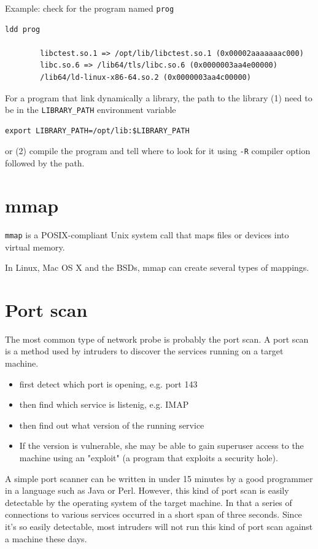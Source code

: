 Example: check for the program named \verb!prog!
\begin{verbatim}
ldd prog

        libctest.so.1 => /opt/lib/libctest.so.1 (0x00002aaaaaaac000)
        libc.so.6 => /lib64/tls/libc.so.6 (0x0000003aa4e00000)
        /lib64/ld-linux-x86-64.so.2 (0x0000003aa4c00000)
\end{verbatim}

For a program that link dynamically a library, the path to the library
(1) need to be in the \verb!LIBRARY_PATH! environment variable
\begin{verbatim}
export LIBRARY_PATH=/opt/lib:$LIBRARY_PATH
\end{verbatim}
or (2) compile the program and tell where to look for it using
\verb!-R! compiler option followed by the path. 

\section{mmap}
\label{sec:mmap}

\verb!mmap! is 
a POSIX-compliant Unix system call that maps files or devices into
virtual memory.

In Linux, Mac OS X and the BSDs, mmap can create several types of mappings.


\section{Port scan}

The most common type of network probe is probably the port scan. 
A port scan is a method used by intruders to discover the services running on a
target machine. 
\begin{itemize}
  \item first detect which port is opening, e.g. port 143
  \item then find which service is listenig, e.g. IMAP
  \item then find out what version of the running service
  \item  If the version is vulnerable, she may be able to gain superuser access
  to the machine using an "exploit" (a program that exploits a security hole).
\end{itemize}

A simple port scanner can be written in under 15 minutes by a good programmer
in a language such as Java or Perl. However, this kind of port scan is easily
detectable by the operating system of the target machine.
In that a series of connections to various services occurred in a short span
of three seconds.  Since it's so easily detectable, most intruders will not run
this kind of port scan against a machine these days.

